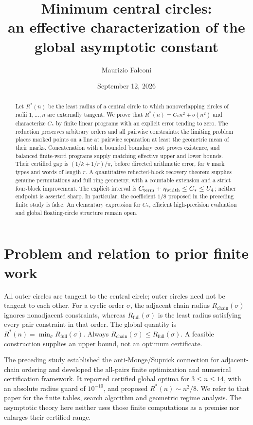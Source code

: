\documentclass[11pt]{article}
\title{Minimum central circles:\\an effective characterization of the global asymptotic constant}
\author{Maurizio Falconi}
\date{September 12, 2026}
\theoremstyle{definition}\newtheorem{definition}[theorem]{Definition}
\theoremstyle{remark}\newtheorem{remark}[theorem]{Remark}
\newcommand{\Rstar}{R^\ast}
\newcommand{\ch}{R_{\mathrm{chain}}}
\newcommand{\full}{R_{\mathrm{full}}}
\newcommand{\CC}{C_\ast}
\begin{document}
\maketitle
\begin{abstract}
Let $\Rstar(n)$ be the least radius of a central circle to which nonoverlapping
circles of radii $1,\ldots,n$ are externally tangent. We prove that
$\Rstar(n)=\CC n^2+o(n^2)$ and characterize $\CC$ by finite linear programs
with an explicit error tending to zero. The reduction preserves arbitrary
orders and all pairwise constraints: the limiting problem places marked
points on a line at pairwise separation at least the geometric mean of their
marks. Concatenation with a bounded boundary cost proves existence, and
balanced finite-word programs supply matching effective upper and lower
bounds. Their certified gap is $(1/k+1/r)/\pi$, before directed arithmetic
error, for $k$ mark types and words of length $r$.
A quantitative reflected-block recovery theorem supplies genuine permutations
and full ring geometry, with a countable extension and a strict four-block
improvement. The explicit interval is
$C_{\rm term}+\eta_{\rm width}\le\CC\le U_4$; neither endpoint is asserted sharp.
In particular, the coefficient $1/8$ proposed in the preceding finite study is false.
An elementary expression for $\CC$, efficient high-precision evaluation and
global floating-circle structure remain open.
\end{abstract}

\section{Problem and relation to prior finite work}

All outer circles are tangent to the central circle; outer circles need
not be tangent to each other. For a cyclic order $\sigma$, the adjacent
chain radius $\ch(\sigma)$ ignores nonadjacent constraints, whereas
$\full(\sigma)$ is the least radius satisfying every pair constraint in
that order. The global quantity is $\Rstar(n)=\min_\sigma\full(\sigma)$.
Always $\ch(\sigma)\le\full(\sigma)$. A feasible construction supplies
an upper bound, not an optimum certificate.

The preceding study \cite{v1} established the anti-Monge/Supnick connection
for adjacent-chain ordering and developed the all-pairs finite optimization
and numerical certification framework. It reported certified global optima
for $3\le n\le14$, with an absolute radius guard of $10^{-10}$, and proposed
$\Rstar(n)\sim n^2/8$. We refer to that paper for the finite tables, search
algorithm and geometric regime analysis. The asymptotic theory here neither
uses those finite computations as a premise nor enlarges their certified
range.
\end{document}

